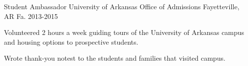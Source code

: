 \begin{cventries}
  \cventry
    {Student Ambassador} %
    {University of Arkansas Office of Admissions} %
    {Fayetteville, AR} %
    {Fa. 2013-2015} %
    {
      \begin{cvitems} %
        \item {Volunteered 2 hours a week guiding tours of the University of Arkansas campus and housing options to prospective students.}
        \item {Wrote thank-you notest to the students and families that visited campus.}
      \end{cvitems}
    }

\end{cventries}
